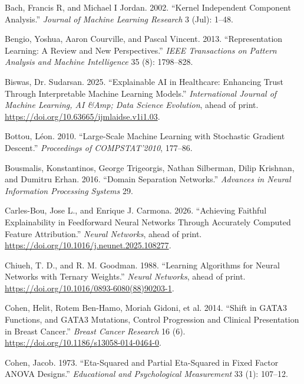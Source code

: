 \documentclass[
  letterpaper,
]{report}
\newlength{\cslhangindent}
\newenvironment{CSLReferences}[2] %
 {\begin{list}{}{%
  \setlength{\itemindent}{0pt}
  \setlength{\leftmargin}{0pt}
  \setlength{\parsep}{0pt}
  \ifodd #1
   \setlength{\leftmargin}{\cslhangindent}
   \setlength{\itemindent}{-1\cslhangindent}
  \fi
  \setlength{\itemsep}{#2\baselineskip}}}
 {\end{list}}
\begin{document}
\begin{CSLReferences}{1}{1}
Bach, Francis R, and Michael I Jordan. 2002. {``Kernel Independent
Component Analysis.''} \emph{Journal of Machine Learning Research} 3
(Jul): 1--48.

Bengio, Yoshua, Aaron Courville, and Pascal Vincent. 2013.
{``Representation Learning: A Review and New Perspectives.''} \emph{IEEE
Transactions on Pattern Analysis and Machine Intelligence} 35 (8):
1798--828.

Biswas, Dr. Sudarsan. 2025. {``Explainable AI in Healthcare: Enhancing
Trust Through Interpretable Machine Learning Models.''}
\emph{International Journal of Machine Learning, AI \&Amp; Data Science
Evolution}, ahead of print.
\url{https://doi.org/10.63665/ijmlaidse.v1i1.03}.

Bottou, Léon. 2010. {``Large-Scale Machine Learning with Stochastic
Gradient Descent.''} \emph{Proceedings of COMPSTAT'2010}, 177--86.

Bousmalis, Konstantinos, George Trigeorgis, Nathan Silberman, Dilip
Krishnan, and Dumitru Erhan. 2016. {``Domain Separation Networks.''}
\emph{Advances in Neural Information Processing Systems} 29.

Carles-Bou, Jose L., and Enrique J. Carmona. 2026. {``Achieving Faithful
Explainability in Feedforward Neural Networks Through Accurately
Computed Feature Attribution.''} \emph{Neural Networks}, ahead of print.
\url{https://doi.org/10.1016/j.neunet.2025.108277}.

Chiueh, T. D., and R. M. Goodman. 1988. {``Learning Algorithms for
Neural Networks with Ternary Weights.''} \emph{Neural Networks}, ahead
of print. \url{https://doi.org/10.1016/0893-6080(88)90203-1}.

Cohen, Helit, Rotem Ben-Hamo, Moriah Gidoni, et al. 2014. {``Shift in
GATA3 Functions, and GATA3 Mutations, Control Progression and Clinical
Presentation in Breast Cancer.''} \emph{Breast Cancer Research} 16 (6).
\url{https://doi.org/10.1186/s13058-014-0464-0}.

Cohen, Jacob. 1973. {``Eta-Squared and Partial Eta-Squared in Fixed
Factor ANOVA Designs.''} \emph{Educational and Psychological
Measurement} 33 (1): 107--12.


\end{CSLReferences}
\end{document}
